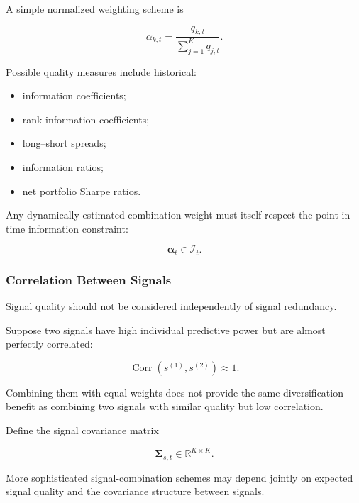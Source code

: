 \documentclass[11pt,a4paper]{article}
\begin{document}
A simple normalized weighting scheme is

\begin{equation}
\boxed{
\alpha_{k,t}
=
\frac{
q_{k,t}
}{
\sum_{j=1}^{K} q_{j,t}
}.
}
\end{equation}

Possible quality measures include historical:

\begin{itemize}
    \item information coefficients;
    \item rank information coefficients;
    \item long--short spreads;
    \item information ratios;
    \item net portfolio Sharpe ratios.
\end{itemize}

Any dynamically estimated combination weight must itself respect the
point-in-time information constraint:

\begin{equation}
\boxed{
\boldsymbol{\alpha}_t
\in
\mathcal{I}_t.
}
\end{equation}


\subsubsection{Correlation Between Signals}

Signal quality should not be considered independently of signal redundancy.

Suppose two signals have high individual predictive power but are almost
perfectly correlated:

\begin{equation}
\operatorname{Corr}
\left(
s^{(1)},
s^{(2)}
\right)
\approx 1.
\end{equation}

Combining them with equal weights does not provide the same diversification
benefit as combining two signals with similar quality but low correlation.

Define the signal covariance matrix

\begin{equation}
\boldsymbol{\Sigma}_{s,t}
\in
\mathbb{R}^{K\times K}.
\end{equation}

More sophisticated signal-combination schemes may depend jointly on expected
signal quality and the covariance structure between signals.
\end{document}

